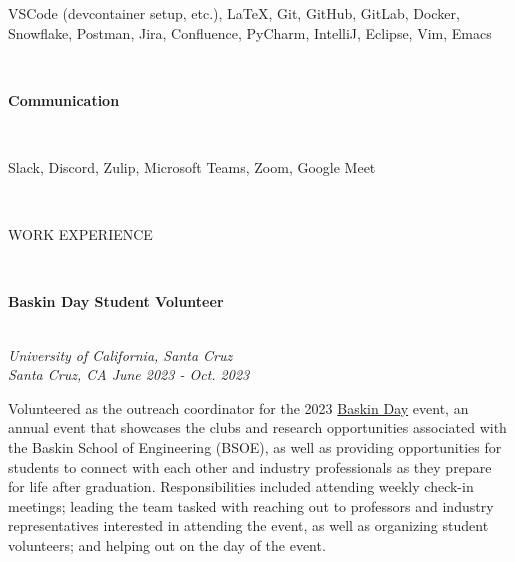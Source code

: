 \documentclass[letterpaper,10pt]{article}
\begin{document}
\begin{multicols*}{2}
  \begin{minipage}{.45\textwidth}
    \begin{flushleft}
      VSCode (devcontainer setup, etc.), \LaTeX, Git, GitHub, GitLab, Docker, Snowflake, Postman, Jira, Confluence, PyCharm, IntelliJ, Eclipse, Vim, Emacs
    \end{flushleft}
  \end{minipage}
  \vspace{.5em} \\
  \begin{large} \textbf{Communication} \end{large}
  \vspace{3px} \\ \indent
  \begin{minipage}{.45\textwidth}
    \begin{flushleft}
      Slack, Discord, Zulip, Microsoft Teams, Zoom, Google Meet
    \end{flushleft}
  \end{minipage}
  \columnbreak \\
  \begin{LARGE}
    \faBriefcase\hspace{5px}WORK EXPERIENCE
  \end{LARGE}
  \vspace{.5em} \\
  \begin{large} \textbf{Baskin Day Student Volunteer} \end{large} \\
  \textit{University of California, Santa Cruz \\ Santa Cruz, CA \hfill June 2023 - Oct. 2023}
  \vspace{5px} \\
  \begin{minipage}{.5\textwidth}
    \begin{flushleft}
      Volunteered as the outreach coordinator for the 2023 \href{https://baskinday.soe.ucsc.edu/}{Baskin Day} event, an annual event that showcases the clubs and research opportunities associated with the Baskin School of Engineering (BSOE), as well as providing opportunities for students to connect with each other and industry professionals as they prepare for life after graduation. Responsibilities included attending weekly check-in meetings; leading the team tasked with reaching out to professors and industry representatives interested in attending the event, as well as organizing student volunteers; and helping out on the day of the event.

\end{flushleft}
\end{minipage}
\end{multicols*}
\end{document}
